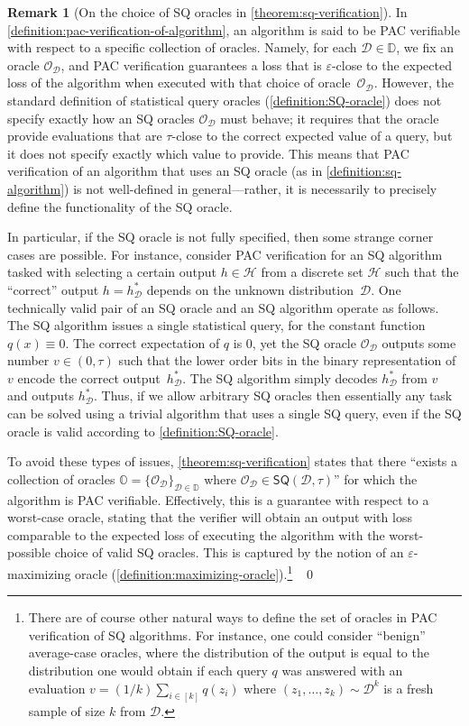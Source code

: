 \documentclass[11pt]{article}
\numberwithin{equation}{section}
\theoremstyle{definition}
\newtheorem{remark}[theorem]{Remark}
\theoremstyle{plain}
\theoremstyle{definition}\newtheorem{notation}[theorem]{Notation}\theoremstyle{plain}\raggedbottom
\newcommand{\roundBrackets}[1]{
	\mathopen{}\left(#1\right)\mathclose{}
}
\newcommand{\customFunctionRound}[2]{
	#1\roundBrackets{#2}
}
\newcommand{\sfFunction}[2]{
	\customFunctionRound{\mathsf{#1}}{#2}
}
\newcommand{\bbD}{\mathbb{D}}
\newcommand{\bbO}{\mathbb{O}}
\newcommand{\cD}{\mathcal{D}}
\newcommand{\cH}{\mathcal{H}}
\newcommand{\cO}{\mathcal{O}}
\newcommand{\1}{\mathds{1}}
\newcommand{\SQ}[1]{\sfFunction{SQ}{#1}}
\begin{document}
\begin{remark}[On the choice of SQ oracles in \cref{theorem:sq-verification}]
	In \cref{definition:pac-verification-of-algorithm}, an algorithm is said to be PAC verifiable with respect to a specific collection of oracles. Namely, for each $\cD \in \bbD$, we fix an oracle $\cO_\cD$, and PAC verification guarantees a loss that is $\varepsilon$-close to the expected loss of the algorithm when executed with that choice of oracle~$\cO_\cD$. However, the standard definition of statistical query oracles (\cref{definition:SQ-oracle}) does not specify exactly how an SQ oracles $\cO_\cD$ must behave; it requires that the oracle provide evaluations  that are $\tau$-close to the correct expected value of a query, but it does not specify exactly which value to provide. This means that PAC verification of an algorithm that uses an SQ oracle (as in \cref{definition:sq-algorithm}) is not well-defined in general---rather, it is necessarily to precisely define the functionality of the SQ oracle. 

	In particular, if the SQ oracle is not fully specified, then some strange corner cases are possible. For instance, consider PAC verification for an SQ algorithm tasked with selecting a certain output $h \in \cH$ from a discrete set $\cH$ such that the ``correct'' output $h=h^*_\cD$ depends on the unknown distribution~$\cD$. One technically valid pair of an SQ oracle and an SQ algorithm operate as follows. The SQ algorithm issues a single statistical query, for the constant function $q(x) \equiv 0$. The correct expectation of $q$ is $0$, yet the SQ oracle $\cO_\cD$ outputs some number $v \in (0,\tau)$ such that the lower order bits in the binary representation of $v$ encode the correct output~$h^*_\cD$. The SQ algorithm simply decodes $h^*_\cD$ from $v$ and outputs $h^*_\cD$. Thus, if we allow arbitrary SQ oracles then essentially any task can be solved using a trivial algorithm that uses a single SQ query, even if the SQ oracle is valid according to \cref{definition:SQ-oracle}.

	To avoid these types of issues, \cref{theorem:sq-verification} states that there ``exists a collection of oracles $\bbO = \{\cO_\cD\}_{\cD \in \bbD}$ where $\cO_\cD \in \SQ{\cD,\tau}$'' for which the algorithm is PAC verifiable. Effectively, this is a guarantee with respect to a worst-case oracle, stating that the verifier will obtain an output with loss comparable to the expected loss of executing the algorithm with the worst-possible choice of valid SQ oracles. This is captured by the notion of an $\varepsilon$-maximizing oracle (\cref{definition:maximizing-oracle}).\footnote{
		There are of course other natural ways to define the set of oracles in PAC verification of SQ algorithms. For instance, one could consider ``benign'' average-case oracles, where the distribution of the output is equal to the distribution one would obtain if each query $q$ was answered with an evaluation $v = (1/k)\sum_{i \in [k]}q(z_i)$ where $(z_1,\dots,z_k)\sim \cD^k$ is a fresh sample of size $k$ from $\cD$.
	}
	~\qed
\end{remark}
\end{document}

